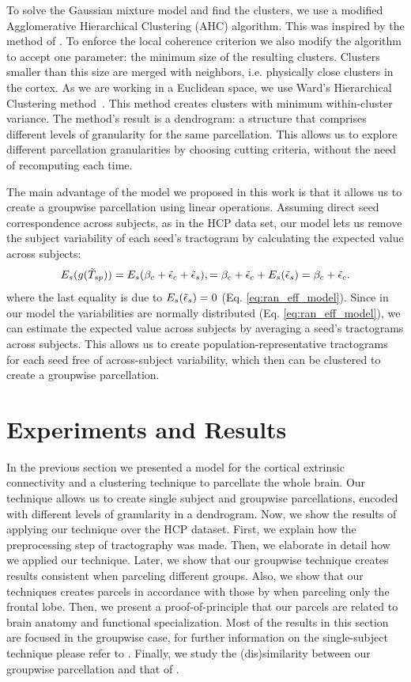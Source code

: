 To solve the Gaussian mixture model and find the clusters, we use a modified
Agglomerative Hierarchical Clustering (AHC) algorithm. This was inspired by the
method of \citet{Moreno-Dominguez2014}. To enforce the local coherence
criterion we also modify the algorithm to accept one parameter: the minimum size
of the resulting clusters. Clusters smaller than this size are merged with
neighbors, i.e. physically close clusters in the cortex. As we are working in
a Euclidean space, we use Ward's Hierarchical Clustering
method~\citep{WardJr.1963}. 
This method creates clusters with minimum within-cluster variance.
The method's result is a dendrogram: a structure that comprises different levels of
granularity for the same parcellation. This allows us to explore different
parcellation granularities by choosing cutting criteria, without the need of
recomputing each time.

The main advantage of the model we proposed in this work is that it
allows us to create a groupwise parcellation using linear operations. Assuming
direct seed correspondence across subjects, as in the HCP data set, our model
lets us remove the subject variability of each seed's tractogram by calculating
the expected value across subjects:
%
\begin{equation}
    \label{eq:expected_subject}
    E_s(g(\tilde T_{sp})) = E_s(\beta_{c} + \tilde \epsilon_{c} + \tilde \epsilon_{s}),
    = \beta_{c} + \tilde \epsilon_{c} + E_s(\tilde \epsilon_{s})
    = \beta_{c} + \tilde \epsilon_{c}.
\end{equation}
% 
where the last equality is due to $E_s(\tilde \epsilon_s)=0$
(Eq. \ref{eq:ran_eff_model}). Since in our model the variabilities are normally
distributed (Eq. \ref{eq:ran_eff_model}), we can estimate the expected value across
subjects by averaging a seed's tractograms across subjects. This allows us to create
population-representative tractograms for each seed free of across-subject 
variability, which then can be clustered to create a groupwise parcellation.
%
\section{Experiments and Results}
%
In the previous section we presented a model for the cortical extrinsic 
connectivity and a clustering technique to parcellate the whole brain. Our technique
allows us to create single subject and groupwise parcellations, encoded with
different levels of granularity in a dendrogram. Now, we show the results of
applying our technique over the HCP dataset. First, we explain how the 
preprocessing step of tractography was made. Then, we elaborate 
in detail how we applied our technique. Later, we show that our groupwise 
technique creates results consistent when parceling different groups. Also,
we show that our techniques creates parcels in accordance with those by 
\citet{ThiebautdeSchotten2016} when parceling only the frontal lobe. Then,
we present a proof-of-principle that our parcels are related to brain anatomy
and functional specialization. Most of the results in this section are focused
in the groupwise case, for further information on the single-subject technique
please refer to \citet{Gallardo2017}. Finally, we study the (dis)similarity
between our groupwise parcellation and that of \citet{Glasser2016}.
%
